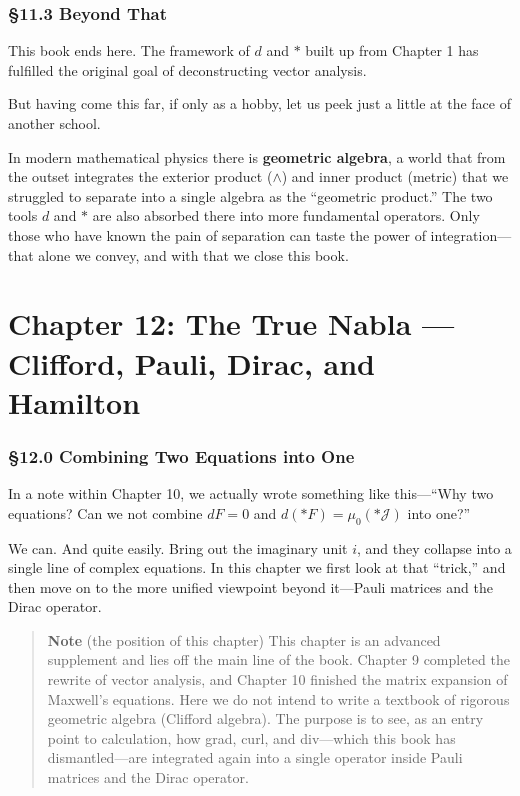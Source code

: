 \documentclass[a4paper,12pt,openany]{book}
\begin{document}
\hypertarget{beyond-that}{%
\subsection{§11.3 Beyond That}\label{beyond-that}}

This book ends here. The framework of \(d\) and \(\ast\) built up from
Chapter 1 has fulfilled the original goal of deconstructing vector
analysis.

But having come this far, if only as a hobby, let us peek just a little
at the face of another school.

In modern mathematical physics there is \textbf{geometric algebra}, a
world that from the outset integrates the exterior product (\(\wedge\))
and inner product (metric) that we struggled to separate into a single
algebra as the ``geometric product.'' The two tools \(d\) and \(\ast\)
are also absorbed there into more fundamental operators. Only those who
have known the pain of separation can taste the power of
integration—that alone we convey, and with that we close this book.

\newpage

\hypertarget{chapter-12-the-true-nabla-clifford-pauli-dirac-and-hamilton}{%
\chapter{Chapter 12: The True Nabla — Clifford, Pauli, Dirac, and
Hamilton}\label{chapter-12-the-true-nabla-clifford-pauli-dirac-and-hamilton}}

\hypertarget{combining-two-equations-into-one}{%
\subsection{§12.0 Combining Two Equations into
One}\label{combining-two-equations-into-one}}

In a note within Chapter 10, we actually wrote something like
this—``Why two equations? Can we not combine \(dF=0\) and
\(d(\ast F)=\mu_0(\ast\mathcal{J})\) into one?''

We can. And quite easily. Bring out the imaginary unit \(i\), and they
collapse into a single line of complex equations. In this chapter we
first look at that ``trick,'' and then move on to the more unified
viewpoint beyond it—Pauli matrices and the Dirac operator.

\begin{quote}
\textbf{Note} (the position of this chapter) This chapter is an advanced
supplement and lies off the main line of the book. Chapter 9 completed
the rewrite of vector analysis, and Chapter 10 finished the matrix
expansion of Maxwell's equations. Here we do not intend to write a
textbook of rigorous geometric algebra (Clifford algebra). The purpose
is to see, as an entry point to calculation, how grad, curl, and
div—which this book has dismantled—are integrated again into a
single operator inside Pauli matrices and the Dirac operator.
\end{quote}
\end{document}
